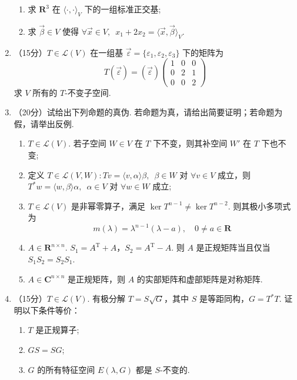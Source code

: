 \begin{enumerate}
\begin{enumerate}
        \item 求 $ \mathbf{R}^3 $ 在 $ \langle \cdot, \cdot \rangle_V $ 下的一组标准正交基;

        \item 求 $ \vec{\beta} \in V $ 使得 $ \forall \vec{x} \in V,\enspace x_1 + 2x_2 = \langle \vec{x}, \vec{\beta} \rangle_V $.
    \end{enumerate}

    \item （15分）$ T \in \mathcal{L}(V) $ 在一组基 $ \vec{\varepsilon} = \{\varepsilon_1, \varepsilon_2, \varepsilon_3\} $ 下的矩阵为
       \[ T(\vec{\varepsilon}) = (\vec{\varepsilon}) \begin{pmatrix} 1 & 0 & 0 \\ 0 & 2 & 1 \\ 0 & 0 & 2 \end{pmatrix} \]
    求 $ V $ 所有的 $ T $-不变子空间.

    \item （20分）试给出下列命题的真伪. 若命题为真，请给出简要证明；若命题为假，请举出反例.
    \begin{enumerate}
        \item $ T \in \mathcal{L}(V) $. 若子空间 $ W \in V $ 在 $ T $ 下不变，则其补空间 $ W' $ 在 $ T $ 下也不变;

        \item 定义 $ T \in \mathcal{L}(V, W) \colon Tv = \langle v, \alpha \rangle \beta,\enspace \beta \in W $ 对 $ \forall v \in V $ 成立，则 $ T^* w = \langle w, \beta \rangle \alpha,\enspace \alpha \in V $ 对 $ \forall w \in W $ 成立;

        \item $ T \in \mathcal{L}(V) $ 是非幂零算子，满足 $ \ker T^{n - 1} \neq \ker T^{n - 2} $. 则其极小多项式为
        \[ m(\lambda) = \lambda^{n-1}(\lambda - a) ,\quad 0 \neq a \in \mathbf{R} \]

        \item $ A \in \mathbf{R}^{n \times n} $. $ S_1 = A^{\mathrm{T}} + A $，$ S_2 = A^{\mathrm{T}} - A $. 则 $ A $ 是正规矩阵当且仅当 $ S_1 S_2 = S_2 S_1 $.

        \item $ A \in \mathbf{C}^{n \times n} $ 是正规矩阵，则 $ A $ 的实部矩阵和虚部矩阵是对称矩阵.
    \end{enumerate}

    \item （15分）$ T \in \mathcal{L}(V) $. 有极分解 $ T = S \sqrt{G} $，其中 $ S $ 是等距同构，$ G = T^* T $. 证明以下条件等价：
       \begin{enumerate}
        \item $ T $ 是正规算子;

        \item $ GS = SG $;

        \item $ G $ 的所有特征空间 $ E(\lambda, G) $ 都是 $ S $-不变的.
    \end{enumerate}
\end{enumerate}

\clearpage
